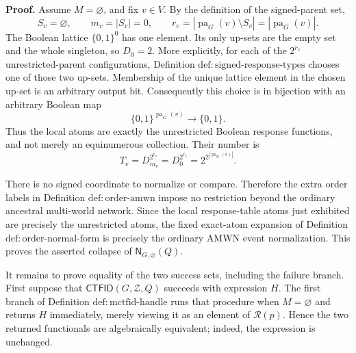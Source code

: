 \textbf{Proof.}
Assume \(M=\varnothing\), and fix \(v\in V\).  By the definition of the signed-parent set,
\[
 S_v=\varnothing,
 \qquad
 m_v=|S_v|=0,
 \qquad
 r_v=|\operatorname{pa}_G(v)\setminus S_v|
     =|\operatorname{pa}_G(v)|.
\]
The Boolean lattice \(\{0,1\}^{0}\) has one element.  Its only up-sets are the empty set and the whole singleton, so \(D_0=2\).  More explicitly, for each of the \(2^{r_v}\) unrestricted-parent configurations, Definition \(\mathrm{def:signed\text{-}response\text{-}types}\) chooses one of those two up-sets.  Membership of the unique lattice element in the chosen up-set is an arbitrary output bit.  Consequently this choice is in bijection with an arbitrary Boolean map
\[
 \{0,1\}^{\operatorname{pa}_G(v)}\longrightarrow\{0,1\}.
\]
Thus the local atoms are exactly the unrestricted Boolean response functions, and not merely an equinumerous collection.  Their number is
\[
 T_v=D_{m_v}^{2^{r_v}}
     =D_0^{2^{r_v}}
     =2^{2^{|\operatorname{pa}_G(v)|}}.
\]

There is no signed coordinate to normalize or compare.  Therefore the extra order labels in Definition \(\mathrm{def:order\text{-}amwn}\) impose no restriction beyond the ordinary ancestral multi-world network.  Since the local response-table atoms just exhibited are precisely the unrestricted atoms, the fixed exact-atom expansion of Definition \(\mathrm{def:order\text{-}normal\text{-}form}\) is precisely the ordinary AMWN event normalization.  This proves the asserted collapse of \(\mathsf N_{G,\varnothing}(Q)\).

It remains to prove equality of the two success sets, including the failure branch.  First suppose that \(\mathsf{CTFID}(G,\mathcal Z,Q)\) succeeds with expression \(H\).  The first branch of Definition \(\mathrm{def:mctfid\text{-}handle}\) runs that procedure when \(M=\varnothing\) and returns \(H\) immediately, merely viewing it as an element of \(\mathcal R(p)\).  Hence the two returned functionals are algebraically equivalent; indeed, the expression is unchanged.

